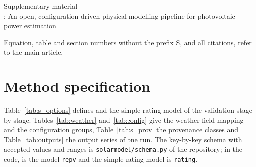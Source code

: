 \documentclass[11pt]{article}
\begin{document}
\begin{center}
{\Large Supplementary material}\\[4pt]
\RePV: An open, configuration-driven physical modelling pipeline for photovoltaic power estimation
\end{center}

Equation, table and section numbers without the prefix S, and all citations, refer to the main article.

\section{Method specification}
\label{sec:s_spec}

Table~\ref{tab:s_options} defines \RePV{} and the simple rating model of the validation stage by stage. Tables~\ref{tab:weather} and~\ref{tab:config} give the weather field mapping and the configuration groups, Table~\ref{tab:s_prov} the provenance classes and Table~\ref{tab:outputs} the output series of one run. The key-by-key schema with accepted values and ranges is \texttt{solarmodel/schema.py} of the repository; in the code, \RePV{} is the model \texttt{repv} and the simple rating model is \texttt{rating}.
\end{document}
